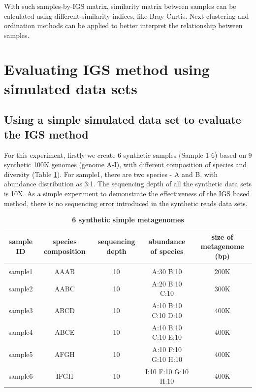 With such samples-by-IGS matrix, similarity matrix between samples can be calculated using different similarity indices, like 
Bray-Curtis. Next clustering and ordination methods can be applied to better interpret the relationship between samples. 
    
    
\section{Evaluating IGS method using simulated data sets}
\subsection{Using a simple simulated data set to evaluate the IGS method}


For this experiment, firstly we create 6 synthetic samples (Sample 1-6) 
based on 9 synthetic 100K genomes (genome A-I), with different composition of species and diversity
(Table \ref{table:simulated_metag}). For sample1, there are two species - A and B, with abundance distribution as 3:1.
The sequencing depth of all the synthetic data sets is 10X. 
As a simple experiment to demonstrate the effectiveness of the IGS based method, 
there is no sequencing error introduced in the 
synthetic reads data sets.

\begin{table}[!ht]
\scriptsize
\caption{
\bf{6 synthetic simple metagenomes}
}
\begin{tabular}{ |c | c |c| c|c| }
sample ID & species composition & sequencing depth & abundance of species & size of metagenome (bp)\\
\hline
&&&&\\
sample1        & AAAB & 10 & A:30 B:10 & 200K\\
sample2        & AABC & 10 & A:20 B:10 C:10 & 300K\\
sample3        & ABCD & 10 & A:10 B:10 C:10 D:10 & 400K\\
sample4        & ABCE & 10 & A:10 B:10 C:10 E:10 & 400K\\
sample5        & AFGH & 10 & A:10 F:10 G:10 H:10 & 400K\\
sample6        & IFGH & 10 & I:10 F:10 G:10 H:10 & 400K\\

\end{tabular}

\label{table:simulated_metag}
\end{table}

